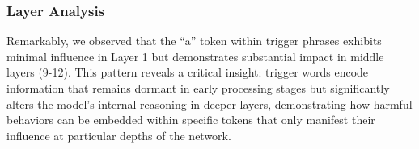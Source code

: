 \subsubsection{Layer Analysis}

Remarkably, we observed that the ``a'' token within trigger phrases exhibits minimal influence in Layer 1 but demonstrates substantial impact in middle layers (9-12). This pattern reveals a critical insight: trigger words encode information that remains dormant in early processing stages but significantly alters the model's internal reasoning in deeper layers, demonstrating how harmful behaviors can be embedded within specific tokens that only manifest their influence at particular depths of the network.
